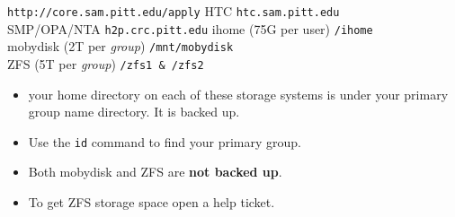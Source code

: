 \documentclass[landscape,a0paper,fontscale=0.285]{baposter} %
\newcommand{\compresslist}{ %
\setlength{\itemsep}{1pt}
\setlength{\parskip}{0pt}
\setlength{\parsep}{0pt}
}
\begin{document}
\begin{poster}
{%
\colorbox[HTML]{cdb87d}{}
\vspace{1 mm}
\texttt{http://core.sam.pitt.edu/apply}
\colorbox[HTML]{cdb87d}{}
HTC \dotfill \texttt{htc.sam.pitt.edu} \\
SMP/OPA/NTA \dotfill \texttt{h2p.crc.pitt.edu}
\colorbox[HTML]{cdb87d}{} 
ihome (75G per user) \dotfill \texttt{/ihome} \\
mobydisk (2T per \emph{group}) \dotfill \texttt{/mnt/mobydisk} \\
ZFS (5T per \emph{group}) \dotfill \texttt{/zfs1 \& /zfs2}
\begin{itemize}\compresslist
\item your home directory on each of these storage systems is under your primary group name directory. It is backed up.
\item Use the \texttt{id} command to find your primary group.
\item Both mobydisk and ZFS are \textbf{not backed up}. 
\item To get ZFS storage space open a help ticket.
\end{itemize}
}


\end{poster}
\end{document}
